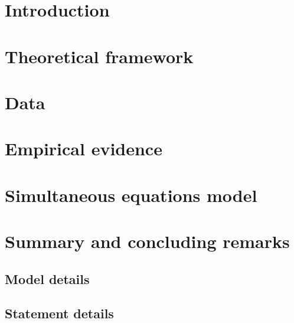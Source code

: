 \begin{refsection}
    
    \section{Introduction} \label{chap3-introduction}
    
    
    \section{Theoretical framework} \label{chap3-theoretical}
    
    
    \section{Data} \label{chap3-data}
    
    
    \section{Empirical evidence} \label{chap3-empirics}
    
    
    \section{Simultaneous equations model} \label{chap3-simultaneous}
    
    
    \section{Summary and concluding remarks} \label{chap3-conclusion}
    
    
    \printbibliography[heading=subbibintoc]
    
    \clearpage
    \renewcommand{\thesubsection}{\thechapter.\Alph{subsection}}
    
    \subsection{Model details} \label{chap3-model}
    
    \clearpage
    \subsection{Statement details} \label{chap3-statement}
    
    \clearpage

\end{refsection}
